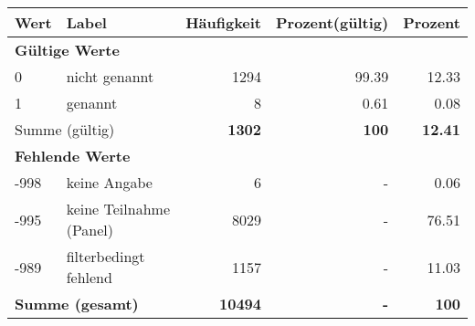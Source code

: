      \begin{longtable}{lXrrr}
     \toprule
     \textbf{Wert} & \textbf{Label} & \textbf{Häufigkeit} & \textbf{Prozent(gültig)} & \textbf{Prozent} \\
     \endhead
     \midrule
     \multicolumn{5}{l}{\textbf{Gültige Werte}}\\

     0 &
     \multicolumn{1}{X}{ nicht genannt   } &


       \num{1294} &
       \num[round-mode=places,round-precision=2]{99.39} &
         \num[round-mode=places,round-precision=2]{12.33} \\

     1 &
     \multicolumn{1}{X}{ genannt   } &


       \num{8} &
       \num[round-mode=places,round-precision=2]{0.61} &
         \num[round-mode=places,round-precision=2]{0.08} \\
     \midrule
     \multicolumn{2}{l}{Summe (gültig)} &
       \textbf{\num{1302}} &
     \textbf{\num{100}} &
       \textbf{\num[round-mode=places,round-precision=2]{12.41}} \\
     \multicolumn{5}{l}{\textbf{Fehlende Werte}}\\
       -998 &
       keine Angabe &
         \num{6} &
        - &
         \num[round-mode=places,round-precision=2]{0.06} \\
       -995 &
       keine Teilnahme (Panel) &
         \num{8029} &
        - &
         \num[round-mode=places,round-precision=2]{76.51} \\
       -989 &
       filterbedingt fehlend &
         \num{1157} &
        - &
         \num[round-mode=places,round-precision=2]{11.03} \\
     \midrule
     \multicolumn{2}{l}{\textbf{Summe (gesamt)}} &
          \textbf{\num{10494}} &
        \textbf{-} &
        \textbf{\num{100}} \\
     \bottomrule
     \end{longtable}
     
